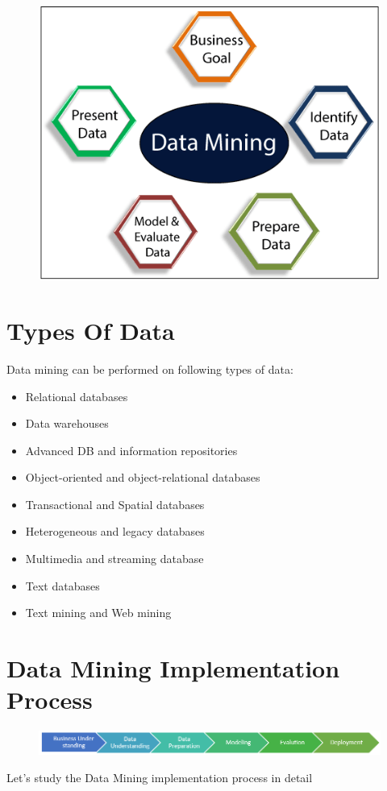 \documentclass[a4paper,10pt]{article}
\begin{document}
\begin{figure}[H]
	\centering
	\includegraphics[width=\linewidth]{DIntro.png}
\end{figure}

\section{Types Of Data}
Data mining can be performed on following types of data:
\begin{itemize}
	\item Relational databases
	\item Data warehouses
	\item Advanced DB and information repositories
	\item Object-oriented and object-relational databases
	\item Transactional and Spatial databases
	\item Heterogeneous and legacy databases
	\item Multimedia and streaming database
	\item Text databases
	\item Text mining and Web mining
\end{itemize}
\newpage
\section{Data Mining Implementation Process}

\begin{figure}[H]
           \centering
           \includegraphics[width=\linewidth]{figure1.png}

\end{figure}
Let's study the Data Mining implementation process in detail
\end{document}
